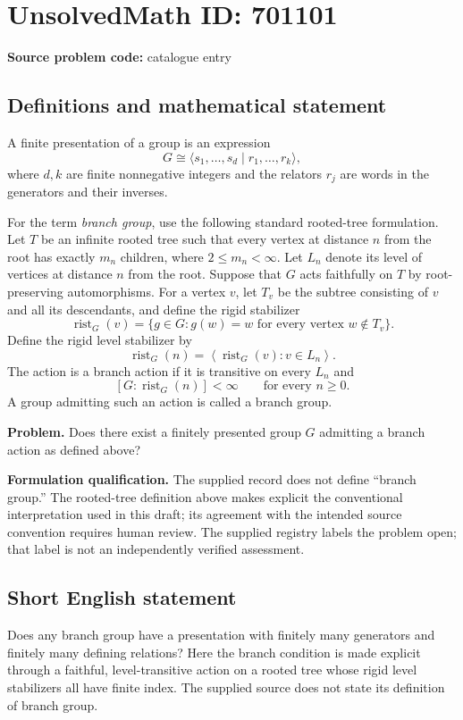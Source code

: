\documentclass[11pt]{article}
\begin{document}
\section*{UnsolvedMath ID: 701101}
\textbf{Source problem code:} catalogue entry
\subsection{Definitions and mathematical statement}
A finite presentation of a group is an expression
\[
G\cong\langle s_1,\ldots,s_d\mid r_1,\ldots,r_k\rangle,
\]
where \(d,k\) are finite nonnegative integers and the relators \(r_j\) are words in the generators and their inverses.

For the term \emph{branch group}, use the following standard rooted-tree formulation. Let \(T\) be an infinite rooted tree such that every vertex at distance \(n\) from the root has exactly \(m_n\) children, where \(2\leq m_n<\infty\). Let \(L_n\) denote its level of vertices at distance \(n\) from the root. Suppose that \(G\) acts faithfully on \(T\) by root-preserving automorphisms. For a vertex \(v\), let \(T_v\) be the subtree consisting of \(v\) and all its descendants, and define the rigid stabilizer
\[
\operatorname{rist}_G(v)=\{g\in G: g(w)=w\text{ for every vertex }w\notin T_v\}.
\]
Define the rigid level stabilizer by
\[
\operatorname{rist}_G(n)=\left\langle\operatorname{rist}_G(v):v\in L_n\right\rangle.
\]
The action is a branch action if it is transitive on every \(L_n\) and
\[
[G:\operatorname{rist}_G(n)]<\infty\qquad\text{for every }n\geq0.
\]
A group admitting such an action is called a branch group.

\textbf{Problem.} Does there exist a finitely presented group \(G\) admitting a branch action as defined above?

\textbf{Formulation qualification.} The supplied record does not define ``branch group.'' The rooted-tree definition above makes explicit the conventional interpretation used in this draft; its agreement with the intended source convention requires human review. The supplied registry labels the problem open; that label is not an independently verified assessment.
\subsection{Short English statement}
Does any branch group have a presentation with finitely many generators and finitely many defining relations? Here the branch condition is made explicit through a faithful, level-transitive action on a rooted tree whose rigid level stabilizers all have finite index. The supplied source does not state its definition of branch group.
\end{document}
